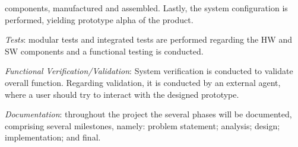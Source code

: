 \begin{item-c}
  components, manufactured and assembled. Lastly,
  the system configuration is performed, yielding prototype alpha of the product.
%
\item \emph{Tests}: modular tests and integrated tests are performed regarding
  the HW and SW components and a functional testing is conducted.
\item \emph{Functional Verification/Validation}: System verification is
  conducted to validate overall function. Regarding validation, it is conducted
  by an external agent, where a user should try to interact with the designed prototype.
\item \emph{Documentation}: throughout the project the several phases will be
  documented, comprising several milestones, namely: problem statement; analysis; design; implementation; and
  final.
\end{item-c}
